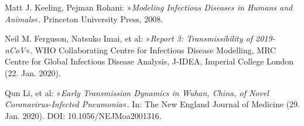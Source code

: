 \documentclass[a4paper,11pt,fleqn,twocolumn,twoside,dvipdfmx]{scrartcl}
\numberwithin{equation}{section}
\begin{document}
\clearpage
\twocolumn
\small

\begin{thebibliography}{00}
 Matt J. Keeling, Pejman Rohani:
»\emph{Modeling Infectious Diseases in Humans and Animals}«.
Princeton University Press, 2008.

 Neil M. Ferguson, Natsuko Imai, et al:
»\emph{Report 3: Transmissibility of 2019-nCoV}«.
WHO Collaborating Centre for Infectious Disease Modelling, MRC Centre
for Global Infectious Disease Analysis, J-IDEA, Imperial College London
(22. Jan. 2020).

 Qun Li, et al: »\emph{Early Transmission Dynamics in
Wuhan, China, of Novel Coronavirus-Infected Pneumonia}«.
In: The New England Journal of Medicine (29. Jan. 2020).
DOI: 10.1056/NEJMoa2001316.
\end{thebibliography}
\end{document}
